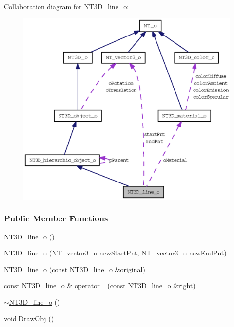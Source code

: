 Collaboration diagram for NT3D\_\-line\_\-o:
\nopagebreak
\begin{figure}[H]
\begin{center}
\leavevmode
\includegraphics[width=400pt]{class_n_t3_d__line__o__coll__graph}
\end{center}
\end{figure}
\subsubsection*{Public Member Functions}
\begin{DoxyCompactItemize}
\item 
\hyperlink{class_n_t3_d__line__o_ac2ca3b2464ce9e96b0e8a88f7ba9d080}{NT3D\_\-line\_\-o} ()
\item 
\hyperlink{class_n_t3_d__line__o_aac7bf537c4b3c21ecb27d82830a377fb}{NT3D\_\-line\_\-o} (\hyperlink{class_n_t__vector3__o}{NT\_\-vector3\_\-o} newStartPnt, \hyperlink{class_n_t__vector3__o}{NT\_\-vector3\_\-o} newEndPnt)
\item 
\hyperlink{class_n_t3_d__line__o_ade3d6fdaf07822a79a568ac5f3ef3b5a}{NT3D\_\-line\_\-o} (const \hyperlink{class_n_t3_d__line__o}{NT3D\_\-line\_\-o} \&original)
\item 
const \hyperlink{class_n_t3_d__line__o}{NT3D\_\-line\_\-o} \& \hyperlink{class_n_t3_d__line__o_ad5c990ad0bbfde9dac9f4e27a64f6b73}{operator=} (const \hyperlink{class_n_t3_d__line__o}{NT3D\_\-line\_\-o} \&right)
\item 
\hyperlink{class_n_t3_d__line__o_a673afe351104b4ab9e24c9a23f27279a}{$\sim$NT3D\_\-line\_\-o} ()
\item 
void \hyperlink{class_n_t3_d__line__o_a0f4a60ac16c5de030db6df7eac534b80}{DrawObj} ()
\end{DoxyCompactItemize}
